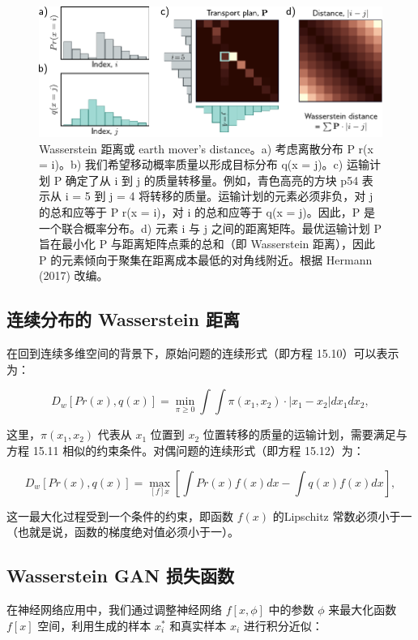 \documentclass[lang=cn,newtx,10pt,scheme=chinese]{elegantbook}
\begin{document}
\begin{figure}[ht!]
\centering
\includegraphics[width=0.7\linewidth]{PDFFigures/UDLChap15PDF/GANWassersteinDist.pdf}
\caption{Wasserstein 距离或 earth mover’s distance。a) 考虑离散分布 P r(x = i)。b) 我们希望移动概率质量以形成目标分布 q(x = j)。c) 运输计划 P 确定了从 i 到 j 的质量转移量。例如，青色高亮的方块 p54 表示从 i = 5 到 j = 4 将转移的质量。运输计划的元素必须非负，对 j 的总和应等于 P r(x = i)，对 i 的总和应等于 q(x = j)。因此，P 是一个联合概率分布。d) 元素 i 与 j 之间的距离矩阵。最优运输计划 P 旨在最小化 P 与距离矩阵点乘的总和（即 Wasserstein 距离），因此 P 的元素倾向于聚集在距离成本最低的对角线附近。根据 Hermann (2017) 改编。}
\end{figure}



\subsection{连续分布的 Wasserstein 距离}
在回到连续多维空间的背景下，原始问题的连续形式（即方程 15.10）可以表示为：

\begin{equation}
D_w [Pr(x), q(x)] = \min_{\pi \geq 0} \int \int \pi(x_1, x_2) \cdot |x_1 - x_2| dx_1 dx_2 , 
\end{equation}

这里，\(\pi(x_1, x_2)\) 代表从 \(x_1\) 位置到 \(x_2\) 位置转移的质量的运输计划，需要满足与方程 15.11 相似的约束条件。对偶问题的连续形式（即方程 15.12）为：

\begin{equation}
D_w [Pr(x), q(x)] = \max_{[f]x} \left[ \int Pr(x)f(x)dx - \int q(x)f(x)dx \right] , 
\end{equation}

这一最大化过程受到一个条件的约束，即函数 \(f(x)\) 的Lipschitz 常数必须小于一（也就是说，函数的梯度绝对值必须小于一）。

\subsection{Wasserstein GAN 损失函数}
在神经网络应用中，我们通过调整神经网络 \(f[x, \phi]\) 中的参数 \(\phi\) 来最大化函数 \(f[x]\) 空间，利用生成的样本 \(x_i^*\) 和真实样本 \(x_i\) 进行积分近似：
\end{document}
